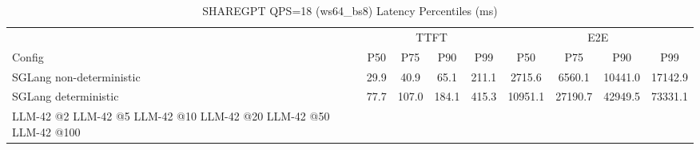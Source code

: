 \begin{table}[htbp]
\centering
\caption{SHAREGPT QPS=18 (ws64_bs8) Latency Percentiles (ms)}
\label{tab:sharegpt_qps18_ws64_bs8}
\begin{tabular}{l|cccc|cccc}
\toprule
& \multicolumn{4}{c|}{TTFT} & \multicolumn{4}{c}{E2E} \\
Config & P50 & P75 & P90 & P99 & P50 & P75 & P90 & P99 \\
\midrule
SGLang non-deterministic & 29.9 & 40.9 & 65.1 & 211.1 & 2715.6 & 6560.1 & 10441.0 & 17142.9 \\
SGLang deterministic & 77.7 & 107.0 & 184.1 & 415.3 & 10951.1 & 27190.7 & 42949.5 & 73331.1 \\
LLM-42 @2%
LLM-42 @5%
LLM-42 @10%
LLM-42 @20%
LLM-42 @50%
LLM-42 @100%
\bottomrule
\end{tabular}
\end{table}
